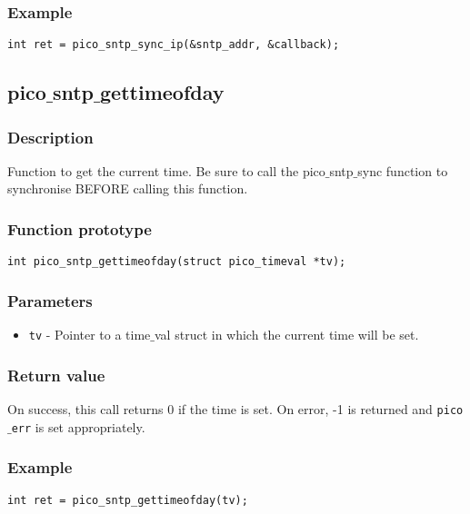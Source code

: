 \subsubsection*{Example}
\begin{verbatim}
int ret = pico_sntp_sync_ip(&sntp_addr, &callback);
\end{verbatim}


\subsection{pico$\_$sntp$\_$gettimeofday}

\subsubsection*{Description}
Function to get the current time. Be sure to call the pico$\_$sntp$\_$sync function to synchronise BEFORE calling this function.

\subsubsection*{Function prototype}
\begin{verbatim}
int pico_sntp_gettimeofday(struct pico_timeval *tv);
\end{verbatim}

\subsubsection*{Parameters}
\begin{itemize}[noitemsep]
\item \texttt{tv} - Pointer to a time$\_$val struct in which the current time will be set.
\end{itemize}

\subsubsection*{Return value}
On success, this call returns 0 if the time is set.
On error, -1 is returned and \texttt{pico$\_$err} is set appropriately.

\subsubsection*{Example}
\begin{verbatim}
int ret = pico_sntp_gettimeofday(tv);
\end{verbatim}




